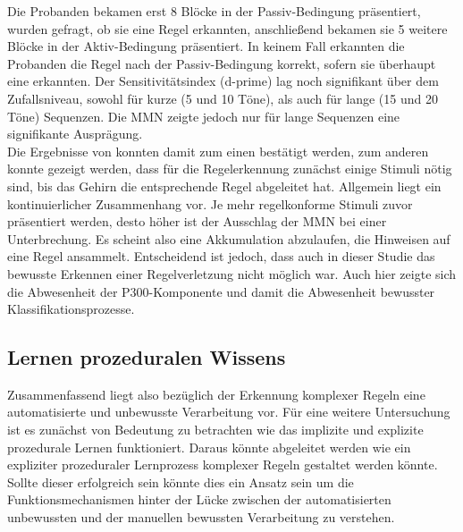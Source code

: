 \documentclass[doc,a4paper,12pt]{apa6}
\begin{document}
Die Probanden bekamen erst 8 Blöcke in der Passiv-Bedingung präsentiert, wurden gefragt, ob sie eine Regel erkannten, anschließend bekamen sie 5 weitere Blöcke in der Aktiv-Bedingung präsentiert. In keinem Fall erkannten die Probanden die Regel nach der Passiv-Bedingung korrekt, sofern sie überhaupt eine erkannten. Der Sensitivitätsindex (d-prime) lag noch signifikant über dem Zufallsniveau, sowohl für kurze (5 und 10 Töne), als auch für lange (15 und 20 Töne) Sequenzen. Die MMN zeigte jedoch nur für lange Sequenzen eine signifikante Ausprägung.\\
Die Ergebnisse von \textcite{paavilainen2007preattentive} konnten damit zum einen bestätigt werden, zum anderen konnte gezeigt werden, dass für die Regelerkennung zunächst einige Stimuli nötig sind, bis das Gehirn die entsprechende Regel abgeleitet hat. Allgemein liegt ein kontinuierlicher Zusammenhang vor. Je mehr regelkonforme Stimuli zuvor präsentiert werden, desto höher ist der Ausschlag der MMN bei einer Unterbrechung. Es scheint also eine Akkumulation abzulaufen, die Hinweisen auf eine Regel ansammelt. Entscheidend ist jedoch, dass auch in dieser Studie das bewusste Erkennen einer Regelverletzung nicht möglich war. Auch hier zeigte sich die Abwesenheit der P300-Komponente und damit die Abwesenheit bewusster Klassifikationsprozesse.


\subsection{Lernen prozeduralen Wissens}

Zusammenfassend liegt also bezüglich der Erkennung komplexer Regeln eine automatisierte und unbewusste Verarbeitung vor. Für eine weitere Untersuchung ist es zunächst von Bedeutung zu betrachten wie das implizite und explizite prozedurale Lernen funktioniert. Daraus könnte abgeleitet werden wie ein expliziter prozeduraler Lernprozess komplexer Regeln gestaltet werden könnte. Sollte dieser erfolgreich sein könnte dies ein Ansatz sein um die Funktionsmechanismen hinter der Lücke zwischen der automatisierten unbewussten und der manuellen bewussten Verarbeitung zu verstehen.
\end{document}
